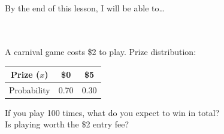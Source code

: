 \documentclass[10pt]{article}
\begin{document}
\namedateperiod

\vspace{0.12in}

\begin{objectivebox}
\small By the end of this lesson, I will be able to\dots\\[4pt]
\writeline\\[1pt]
\writeline\\[1pt]
\writeline
\end{objectivebox}

\vspace{0.1in}

\begin{vocabbox}
\end{vocabbox}

\vspace{0.1in}

\begin{hookbox}
\small
A carnival game costs \$2 to play. Prize distribution:
\begin{center}
\renewcommand{\arraystretch}{1.3}
\begin{tabular}{@{}ccc@{}}
Prize ($x$) & \$0 & \$5 \\
\hline
Probability & 0.70 & 0.30 \\
\end{tabular}
\end{center}
If you play 100 times, what do you expect to win in total? \blank{4cm}\\
Is playing worth the \$2 entry fee? \blank{5cm}
\end{hookbox}

\vspace{0.1in}
\end{document}
